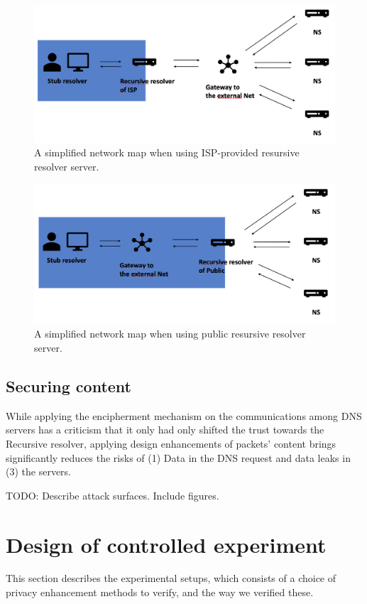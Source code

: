 \documentclass[a4paper,12pt]{article}
\begin{document}
\begin{figure}[ht!]
    \begin{center}
    \includegraphics*[width=0.6\columnwidth]{img/isp-recursive}
    \end{center}
    \caption{A simplified network map when using ISP-provided resursive resolver server.}
    \label{isprecursive}
\end{figure}

\begin{figure}[ht!]
    \begin{center}
    \includegraphics*[width=0.6\columnwidth]{img/public-recursive}
    \end{center}
    \caption{A simplified network map when using public resursive resolver server.}
    \label{publicrecursive}
\end{figure}

\subsection{Securing content}
While applying the encipherment mechanism on the communications among DNS servers has a criticism that it only had only shifted the trust towards the Recursive resolver, applying design enhancements of packets' content brings significantly reduces the risks of (1) Data in the DNS request and data leaks in (3) the servers.

TODO: Describe attack surfaces. Include figures.
\newpage
\section{Design of controlled experiment}
This section describes the experimental setups, which consists of a choice of privacy enhancement methods to verify, and the way we verified these.
\end{document}
